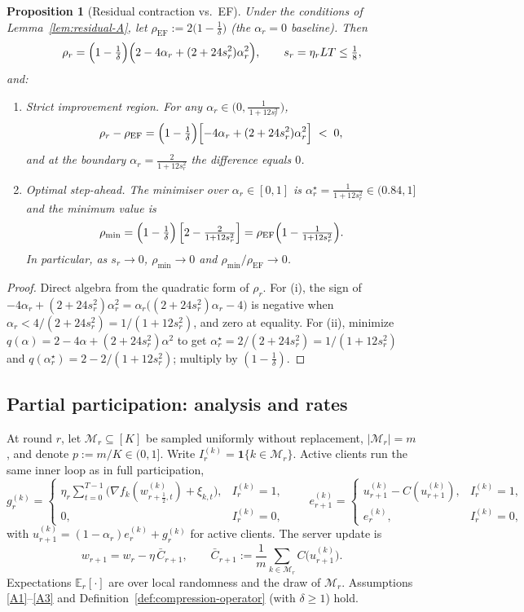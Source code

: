 \documentclass{article} %
\def\1{\bm{1}}
\newcommand{\E}{\mathbb{E}}
\newtheorem{proposition}{Proposition}
\begin{document}
\begin{proposition}[Residual contraction vs.\ EF]\label{prop:sapef-rho}
Under the conditions of Lemma~\ref{lem:residual-A}, let
$\rho_{\mathrm{EF}}:=2\bigl(1-\tfrac1\delta\bigr)$ (the $\alpha_r=0$ baseline).
Then
\[
\rho_r
=\Bigl(1-\tfrac1\delta\Bigr)\Bigl(2-4\alpha_r+(2+24s_r^2)\alpha_r^2\Bigr),
\qquad s_r=\eta_rLT\le\tfrac18,
\]
and:
\begin{enumerate}
\item \emph{Strict improvement region.} For any
$\alpha_r\in\bigl(0,\tfrac{1}{\,1+12s_r^2\,}\bigr)$,
\[
\rho_r-\rho_{\mathrm{EF}}
=\Bigl(1-\tfrac1\delta\Bigr)\Bigl[-4\alpha_r+(2+24s_r^2)\alpha_r^2\Bigr]\;<\;0,
\]
and at the boundary $\alpha_r=\tfrac{2}{1+12s_r^2}$ the difference equals $0$.
\item \emph{Optimal step-ahead.}
The minimiser over $\alpha_r\in[0,1]$ is
\(
\alpha_r^\star=\frac{1}{1+12s_r^2}\in(0.84,1]
\)
and the minimum value is
\[
\rho_{\min}
=\Bigl(1-\tfrac1\delta\Bigr)\, \Bigl[2- \tfrac{2}{1+12s_r^2}\Bigr]
=\rho_{\mathrm{EF}}\Bigl(1-\tfrac{1}{1+12s_r^2}\Bigr).
\]
In particular, as $s_r\to 0$, $\rho_{\min}\to 0$ and
$\rho_{\min}/\rho_{\mathrm{EF}}\to 0$.
\end{enumerate}
\end{proposition}

\begin{proof}
Direct algebra from the quadratic form of $\rho_r$.
For (i), the sign of
$-4\alpha_r+(2+24s_r^2)\alpha_r^2
= \alpha_r\big((2+24s_r^2)\alpha_r-4\big)$
is negative when $\alpha_r<4/(2+24s_r^2)=1/(1+12s_r^2)$, and zero at equality.
For (ii), minimize
$q(\alpha)=2-4\alpha+(2+24s_r^2)\alpha^2$ to get
$\alpha_r^\star=2/(2+24s_r^2)=1/(1+12s_r^2)$ and
$q(\alpha_r^\star)=2-2/(1+12s_r^2)$; multiply by $(1-\tfrac1\delta)$.
\end{proof}

\subsection{Partial participation: analysis and rates}

At round $r$, let $\mathcal M_r\subseteq[K]$ be sampled uniformly without replacement,
$|\mathcal M_r|=m$, and denote $p:=m/K\in(0,1]$. Write $I_r^{(k)}=\1\{k\in\mathcal M_r\}$.
Active clients run the same inner loop as in full participation,
\[
g_r^{(k)}=\begin{cases}
\eta_r\sum_{t=0}^{T-1}\bigl(\nabla f_k(w_{r+\frac12,t}^{(k)})+\xi_{k,t}\bigr),& I_r^{(k)}=1,\\[2pt]
0,& I_r^{(k)}=0,
\end{cases}
\qquad
e_{r+1}^{(k)}=\begin{cases}
u_{r+1}^{(k)}-C(u_{r+1}^{(k)}),& I_r^{(k)}=1,\\[2pt]
e_r^{(k)},& I_r^{(k)}=0,
\end{cases}
\]
with $u_{r+1}^{(k)}=(1-\alpha_r)e_r^{(k)}+g_r^{(k)}$ for active clients. The server update is
\[
w_{r+1}=w_r-\eta\,\bar C_{r+1},\qquad
\bar C_{r+1}:=\frac{1}{m}\sum_{k\in\mathcal M_r}C\bigl(u_{r+1}^{(k)}\bigr).
\]
Expectations $\E_r[\cdot]$ are over local randomness and the draw of $\mathcal M_r$.
Assumptions \ref{A1}--\ref{A3} and Definition~\ref{def:compression-operator} (with $\delta\ge1$) hold.
\end{document}
